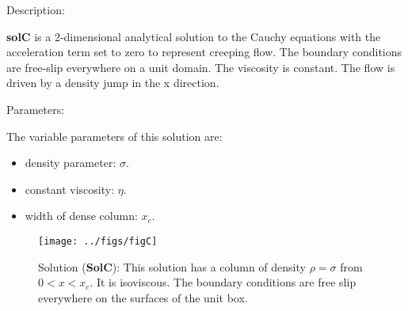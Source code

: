   {\large \fontB Description:}
  
  {\bf solC} is a 2-dimensional analytical solution to the Cauchy equations with the acceleration term set to zero
  to represent creeping flow. The boundary conditions are free-slip everywhere on a unit domain. The viscosity is constant.
  The flow is driven by a density jump in the x direction.

 {\large \fontB Parameters:}
  
 The variable parameters of this solution are:
 \begin{itemize}
   \item{density parameter: $ \sigma $.}
   \item{constant viscosity: $\eta$.}
   \item{width of dense column: $x_c$.}
 \end{itemize}

  \begin{SCfigure}[][h]
    \texttt{[image: ../figs/figC]}
    \caption[Short caption]{\label{figC} 
      Solution ({\bf SolC}):
      This solution has a column of density $\rho = \sigma$ from $0 < x < x_c$.
      It is isoviscous.
      The boundary conditions are free slip everywhere on the surfaces of the unit box.}
  \end{SCfigure} 
  

